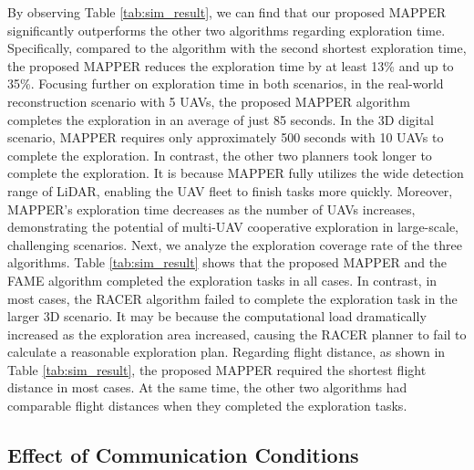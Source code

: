 \documentclass[letterpaper, 10pt, journal, twoside]{support/IEEEtran}
\begin{document}
By observing Table \ref{tab:sim_result}, we can find that our proposed MAPPER significantly outperforms the other two algorithms regarding exploration time. Specifically, compared to the algorithm with the second shortest exploration time,  the proposed MAPPER reduces the exploration time by at least 13\% and up to 35\%.
Focusing further on exploration time in both scenarios, in the real-world reconstruction scenario with 5 UAVs, the proposed MAPPER algorithm completes the exploration in an average of just 85 seconds. In the 3D digital scenario, MAPPER requires only approximately 500 seconds with 10 UAVs to complete the exploration. In contrast, the other two planners took longer to complete the exploration. It is because MAPPER fully utilizes the wide detection range of LiDAR, enabling the UAV fleet to finish tasks more quickly. Moreover, MAPPER's exploration time decreases as the number of UAVs increases, demonstrating the potential of multi-UAV cooperative exploration in large-scale, challenging scenarios.
Next, we analyze the exploration coverage rate of the three algorithms. Table \ref{tab:sim_result} shows that the proposed MAPPER and the FAME algorithm completed the exploration tasks in all cases. In contrast, in most cases, the RACER algorithm failed to complete the exploration task in the larger 3D scenario. It may be because the computational load dramatically increased as the exploration area increased, causing the RACER planner to fail to calculate a reasonable exploration plan. Regarding flight distance, as shown in Table \ref{tab:sim_result}, the proposed MAPPER required the shortest flight distance in most cases. At the same time, the other two algorithms had comparable flight distances when they completed the exploration tasks.

\subsection{Effect of Communication Conditions}
\label{subsec:communications}

\end{document}
